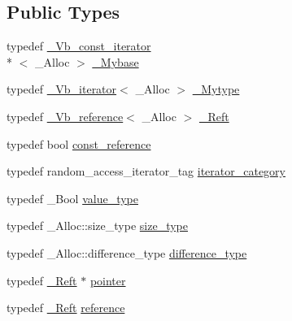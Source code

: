 \subsection*{Public Types}
\begin{DoxyCompactItemize}
\item 
typedef \hyperlink{class___vb__const__iterator}{\+\_\+\+Vb\+\_\+const\+\_\+iterator}\\*
$<$ \+\_\+\+Alloc $>$ \hyperlink{class___vb__iterator_ad51a01f62e10e7da8f8aa6393e5fa4db}{\+\_\+\+Mybase}
\item 
typedef \hyperlink{class___vb__iterator}{\+\_\+\+Vb\+\_\+iterator}$<$ \+\_\+\+Alloc $>$ \hyperlink{class___vb__iterator_a2fff8ac5ba795d77033915aa2a358403}{\+\_\+\+Mytype}
\item 
typedef \hyperlink{class___vb__reference}{\+\_\+\+Vb\+\_\+reference}$<$ \+\_\+\+Alloc $>$ \hyperlink{class___vb__iterator_a30e2e5d349b96c5988cd782e69c58161}{\+\_\+\+Reft}
\item 
typedef bool \hyperlink{class___vb__iterator_ad346337dd66c8689d4017f3b74b7d50f}{const\+\_\+reference}
\item 
typedef random\+\_\+access\+\_\+iterator\+\_\+tag \hyperlink{class___vb__iterator_a637be1a0886bd658f935ce022e5bfe09}{iterator\+\_\+category}
\item 
typedef \+\_\+\+Bool \hyperlink{class___vb__iterator_ae9282be9870338a878afd631ba072555}{value\+\_\+type}
\item 
typedef \+\_\+\+Alloc\+::size\+\_\+type \hyperlink{class___vb__iterator_a9dfed016c4d7f08f4bac304af81f8397}{size\+\_\+type}
\item 
typedef \+\_\+\+Alloc\+::difference\+\_\+type \hyperlink{class___vb__iterator_a148abf77b7a6501dc20581b9f4b1dfe4}{difference\+\_\+type}
\item 
typedef \hyperlink{class___vb__const__iterator_a9955dddb0c1346eacd54df1c2cc6e628}{\+\_\+\+Reft} $\ast$ \hyperlink{class___vb__iterator_abfdae002074201202d96a0200ca2ab23}{pointer}
\item 
typedef \hyperlink{class___vb__const__iterator_a9955dddb0c1346eacd54df1c2cc6e628}{\+\_\+\+Reft} \hyperlink{class___vb__iterator_a0fd0a2449dbc621f22117b1999cb1929}{reference}
\end{DoxyCompactItemize}
